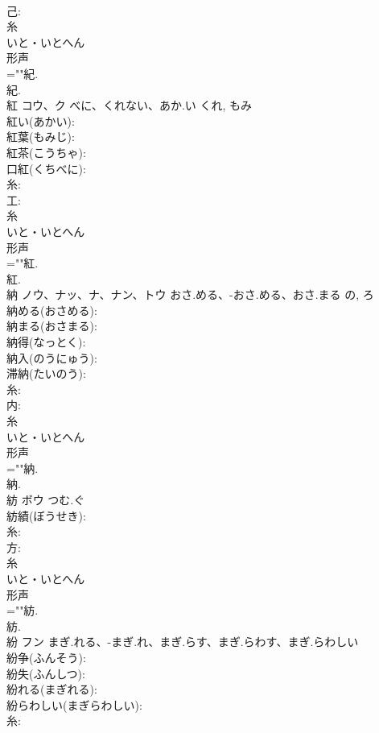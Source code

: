\documentclass[8pt]{extreport}
\begin{document}
\begin{CJK}{UTF8}{min}
\\	己: 
\\	糸	
\\	いと・いとへん	
\\	形声 
\\	=""紀.
\\	紀.
\\	紅	コウ、ク	べに、くれない、あか.い	くれ, もみ	
\\	紅い(あかい): 
\\	紅葉(もみじ): 
\\	紅茶(こうちゃ): 
\\	口紅(くちべに): 
\\	糸: 
\\	工: 
\\	糸	
\\	いと・いとへん	
\\	形声 
\\	=""紅.
\\	紅.
\\	納	ノウ、ナッ、ナ、ナン、トウ	おさ.める、-おさ.める、おさ.まる	の, ろ	
\\	納める(おさめる): 
\\	納まる(おさまる): 
\\	納得(なっとく): 
\\	納入(のうにゅう): 
\\	滞納(たいのう): 
\\	糸: 
\\	内: 
\\	糸	
\\	いと・いとへん	
\\	形声 
\\	=""納.
\\	納.
\\	紡	ボウ	つむ.ぐ		
\\	紡績(ぼうせき): 
\\	糸: 
\\	方: 
\\	糸	
\\	いと・いとへん	
\\	形声 
\\	=""紡.
\\	紡.
\\	紛	フン	まぎ.れる、-まぎ.れ、まぎ.らす、まぎ.らわす、まぎ.らわしい		
\\	紛争(ふんそう): 
\\	紛失(ふんしつ): 
\\	紛れる(まぎれる): 
\\	紛らわしい(まぎらわしい): 
\\	糸: 

\end{CJK}
\end{document}
